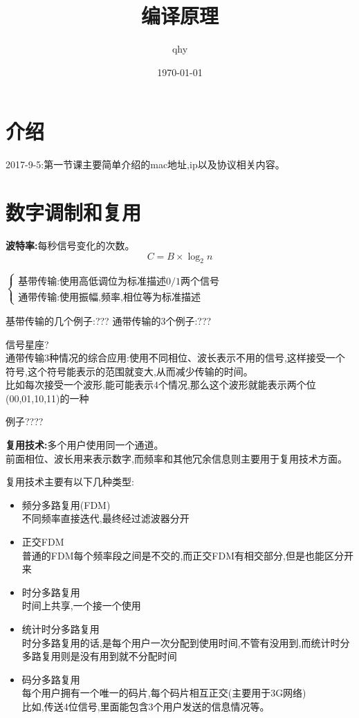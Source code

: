 \documentclass[UTF8,a4paper]{ctexart}
\author{ qhy }
\date{\today}
\title{编译原理}
\newcommand{\spaceline}{\vspace{\baselineskip}}
\begin{document}
  \maketitle
  \tableofcontents
  \newpage

  \section{介绍}
  2017-9-5:第一节课主要简单介绍的mac地址,ip以及协议相关内容。

  \section{数字调制和复用}
  \textbf{波特率:}每秒信号变化的次数。
  \[C = B \times \log_2 n\]

  \spaceline
  $\left \{ \begin{array}{l}
  \text{基带传输:使用高低调位为标准描述0/1两个信号}\\
  \text{通带传输:使用振幅,频率,相位等为标准描述}
  \end{array} \right .$

  基带传输的几个例子:???
  通带传输的3个例子:???

  信号星座?\\
  通带传输3种情况的综合应用:使用不同相位、波长表示不用的信号,这样接受一个符号,这个符号能表示的范围就变大,从而减少传输的时间。\\
  比如每次接受一个波形,能可能表示4个情况,那么这个波形就能表示两个位(00,01,10,11)的一种

  例子????

  \textbf{复用技术:}多个用户使用同一个通道。\\
  前面相位、波长用来表示数字,而频率和其他冗余信息则主要用于复用技术方面。

  复用技术主要有以下几种类型:
  \begin{itemize}
    \item 频分多路复用(FDM)\\
    不同频率直接迭代,最终经过滤波器分开
    \item 正交FDM\\
    普通的FDM每个频率段之间是不交的,而正交FDM有相交部分,但是也能区分开来
    \item 时分多路复用\\
    时间上共享,一个接一个使用
    \item 统计时分多路复用\\
    时分多路复用的话,是每个用户一次分配到使用时间,不管有没用到,而统计时分多路复用则是没有用到就不分配时间
    \item 码分多路复用\\
    每个用户拥有一个唯一的码片,每个码片相互正交(主要用于3G网络)\\
    比如,传送4位信号,里面能包含3个用户发送的信息情况等。
  \end{itemize}
\end{document}
